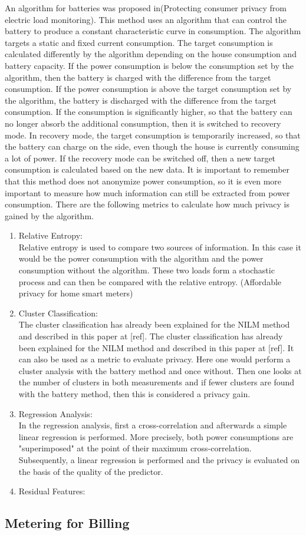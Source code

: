 An algorithm for batteries was proposed in(Protecting consumer privacy
from electric load monitoring). This method uses an algorithm that can control the battery to produce a constant characteristic curve in consumption.  The algorithm targets a static and fixed current consumption. The target consumption is calculated differently by the algorithm depending on the house consumption and battery capacity. If the power consumption is below the consumption set by the algorithm, then the battery is charged with the difference from the target consumption. If the power consumption is above the target consumption set by the algorithm, the battery is discharged with the difference from the target consumption. If the consumption is significantly higher, so that the battery can no longer absorb the additional consumption, then it is switched to recovery mode. In recovery mode, the target consumption is temporarily increased, so that the battery can charge on the side, even though the house is currently consuming a lot of power. If the recovery mode can be switched off, then a new target consumption is calculated based on the new data. It is important to remember that this method does not anonymize power consumption, so it is even more important to measure how much information can still be extracted from power consumption. There are the following metrics to calculate how much privacy is gained by the algorithm.
\begin{enumerate}
\item Relative Entropy:\\
Relative entropy is used to compare two sources of information. In this case it would be the power consumption with the algorithm and the power consumption without the algorithm. These two loads form a stochastic process and can then be compared with the relative entropy. (Affordable privacy for home
smart meters)
\item Cluster Classification:\\
The cluster classification has already been explained for the NILM method and described in this paper at [ref].  The cluster classification has already been explained for the NILM method and described in this paper at [ref]. It can also be used as a metric to evaluate privacy. Here one would perform a cluster analysis with the battery method and once without. Then one looks at the number of clusters in both measurements and if fewer clusters are found with the battery method, then this is considered a privacy gain.
\item Regression Analysis:\\
In the regression analysis, first a cross-correlation and afterwards a simple linear regression is performed. More precisely, both power consumptions are "superimposed" at the point of their maximum cross-correlation. Subsequently, a linear regression is performed and the privacy is evaluated on the basis of the quality of the predictor.
\item Residual Features:\\
\end{enumerate}

\subsection{Metering for Billing}


\cleardoublepage

